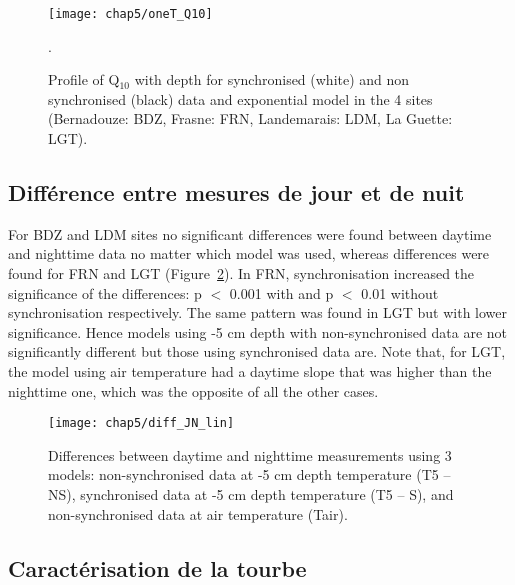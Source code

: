 \begin{figure}
\centering
\texttt{[image: chap5/oneT\_Q10]}
\caption{Profile of Q$_{10}$ with depth for synchronised (white) and non synchronised (black) data and exponential model in the 4 sites (Bernadouze: BDZ, Frasne: FRN, Landemarais: LDM, La Guette: LGT).}.
\label{fig:oneT_Q10}
\end{figure}

\subsection{Différence entre mesures de jour et de nuit}



For BDZ and LDM sites no significant differences were found between daytime and nighttime data no matter which model was used, whereas differences were found for FRN and LGT (Figure~\ref{fig:diff_JN}). 
In FRN, synchronisation increased the significance of the differences: p $<$ 0.001 with and p $<$ 0.01 without synchronisation respectively.
The same pattern was found in LGT but with lower significance.
Hence models using -5 cm depth with non-synchronised data are not significantly different but those using synchronised data are.
Note that, for LGT, the model using air temperature had a daytime slope that was higher than the nighttime one, which was the opposite of all the other cases.

\begin{figure}
\centering
\texttt{[image: chap5/diff\_JN\_lin]}
\caption{Differences between daytime and nighttime measurements using 3 models: non-synchronised data at -5 cm depth temperature (T5 -- NS), synchronised data at -5 cm depth temperature (T5 -- S), and non-synchronised data at air temperature (Tair).}
\label{fig:diff_JN}
\end{figure}

\subsection{Caractérisation de la tourbe}

